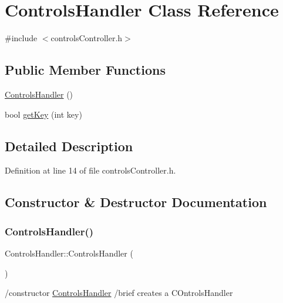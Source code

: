 \hypertarget{class_controls_handler}{}\section{Controls\+Handler Class Reference}
\label{class_controls_handler}


{\ttfamily \#include $<$controls\+Controller.\+h$>$}

\subsection*{Public Member Functions}
\begin{DoxyCompactItemize}
\item 
\hyperlink{class_controls_handler_a49bf8377b225fa92ee71426d621825a0}{Controls\+Handler} ()
\item 
bool \hyperlink{class_controls_handler_a972e6c177eebdbe46033e39e64152f62}{get\+Key} (int key)
\end{DoxyCompactItemize}


\subsection{Detailed Description}


Definition at line 14 of file controls\+Controller.\+h.



\subsection{Constructor \& Destructor Documentation}
\mbox{\label{class_controls_handler_a49bf8377b225fa92ee71426d621825a0}} 
\subsubsection{\texorpdfstring{Controls\+Handler()}{ControlsHandler()}}
{\footnotesize\ttfamily Controls\+Handler\+::\+Controls\+Handler (\begin{DoxyParamCaption}{ }\end{DoxyParamCaption})}

/constructor \hyperlink{class_controls_handler}{Controls\+Handler} /brief creates a C\+Ontrols\+Handler 

